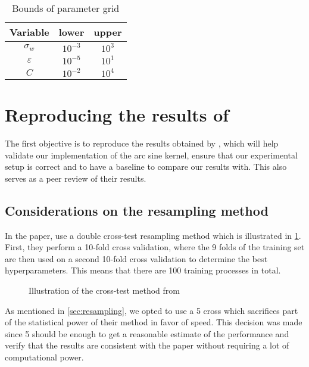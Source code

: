 \begin{table}[H]
    \caption{Bounds of parameter grid}%
    \label{tab:paramgrid}
    \begin{tabular}{ccc}
        \toprule
        Variable      & lower     & upper  \\
        \midrule
        $\sigma_w$    & $10^{-3}$ & $10^3$ \\
        $\varepsilon$ & $10^{-5}$ & $10^1$ \\
        $C$           & $10^{-2}$ & $10^4$ \\
        \bottomrule
    \end{tabular}
\end{table}

\section{Reproducing the results of \texorpdfstring{\citeauthor{frenayParameterinsensitiveKernelExtreme2011}}{Frénay and Verleysen}}
\label{sec:reproducing-frenay}

The first objective is to reproduce the results obtained by
\textcite{frenayParameterinsensitiveKernelExtreme2011}, which will help validate
our implementation of the arc sine kernel, ensure that our experimental setup is
correct and to have a baseline to compare our results with. This also serves as
a peer review of their results.

\subsection{Considerations on the resampling method}

In the paper, \citeauthor{frenayParameterinsensitiveKernelExtreme2011} use a
double cross-test resampling method which is illustrated in
\cref{fig:frenay-cross-test}. First, they perform a 10-fold cross validation,
where the 9 folds of the training set are then used on a second 10-fold cross
validation to determine the best hyperparameters. This means that there are 100
training processes in total.

\begin{figure}[H]
    
    \caption{Illustration of the cross-test method from \cite{frenayParameterinsensitiveKernelExtreme2011}}
    \label{fig:frenay-cross-test}
\end{figure}

As mentioned in \cref{sec:resampling}, we opted to use a 5 cross
which sacrifices part of the statistical power of their method in favor of
speed. This decision was made since 5 should be enough to get a
reasonable estimate of the performance and verify that the results are
consistent with the paper without requiring a lot of computational power.

